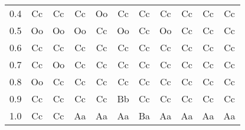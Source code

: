 \begin{table}[tb]
\begin{center}
\begin{tabular}{c|cccccccccc}
0.4                    & Cc  & Cc  & Cc  & Oo  & Cc  & Cc  & Cc  & Cc  & Cc  & Cc  \\       
0.5                    & Oo  & Oo  & Oo  & Cc  & Oo  & Cc  & Oo  & Cc  & Cc  & Cc  \\       
0.6                    & Cc  & Cc  & Cc  & Cc  & Cc  & Cc  & Cc  & Cc  & Cc  & Cc  \\       
0.7                    & Cc  & Oo  & Cc  & Cc  & Cc  & Cc  & Cc  & Cc  & Cc  & Cc  \\       
0.8                    & Oo  & Cc  & Cc  & Cc  & Cc  & Cc  & Cc  & Cc  & Cc  & Cc  \\       
0.9                    & Cc  & Cc  & Cc  & Cc  & Bb  & Cc  & Cc  & Cc  & Cc  & Cc  \\       
1.0                    & Cc  & Cc  & Aa  & Aa  & Aa  & Ba  & Aa  & Aa  & Aa  & Aa  \\       
\hline
\end{tabular}
\end{center}
\end{table}

